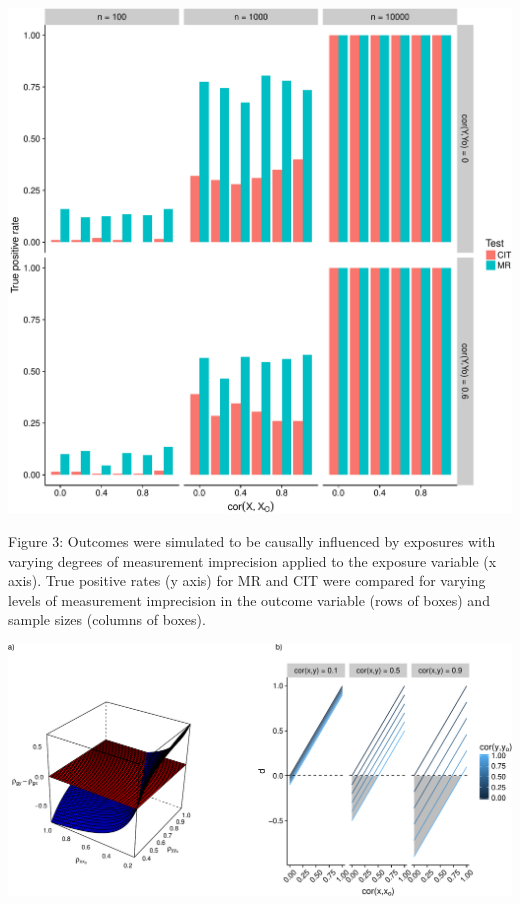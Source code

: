 \documentclass[]{article}
\begin{document}
\newpage

\includegraphics{manuscript_files/figure-latex/causality_exists_tpr-1.pdf}

Figure 3: Outcomes were simulated to be causally influenced by exposures
with varying degrees of measurement imprecision applied to the exposure
variable (x axis). True positive rates (y axis) for MR and CIT were
compared for varying levels of measurement imprecision in the outcome
variable (rows of boxes) and sample sizes (columns of boxes).

\newpage

\includegraphics{manuscript_files/figure-latex/steiger_sensitivity_plot-1.pdf}
\end{document}
